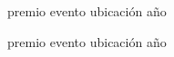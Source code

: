 



\begin{cvhonors}

  \cvhonor
    {premio} %
    {evento} %
    {ubicación} %
    {año} %


\end{cvhonors}




\begin{cvhonors}

  \cvhonor
    {premio} %
    {evento} %
    {ubicación} %
    {año} %

\end{cvhonors}
